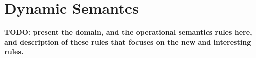 \section{Dynamic Semantcs}
\label{sec:semantics}

{\bf TODO: present the domain, and the operational semantics rules here,
and description of these rules that focuses on the new and interesting rules.}
